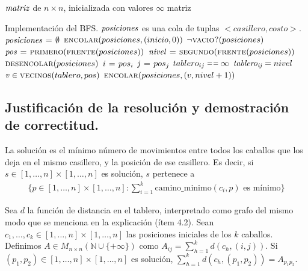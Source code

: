 \vspace*{0.3cm}


\begin{codebox}
\li \Comment $\id{matriz}$ de $n \times n$, inicializada con valores $\infty$
\li \Return matriz
\end{codebox}


\vspace*{0.3cm}


\begin{codebox}
\li \Comment Implementación del BFS. 
\li \Comment $\id{posiciones}$ es una cola de tuplas $<casillero,costo>$.
\li $\id{posiciones} \gets \emptyset$
\li $\textnormal{\scshape encolar}(posiciones, (inicio,0))$
\li \While $\lnot \textnormal{\scshape vacio?}(posiciones)$ \Do
\li   $\id{pos} \gets \proc{primero}(\proc{frente}(posiciones))$
\li   $\id{nivel} \gets \proc{segundo}(\proc{frente}(posiciones))$
\li   $\textnormal{\scshape desencolar}(posiciones)$
\li   $\id{i} \gets pos_i$
\li   $\id{j} \gets pos_j$
\li   \If $tablero_{ij} \isequal \infty$ \Then
\li     $\id{tablero_{ij}} = nivel$
\li     \For $\id{v} \in \proc{vecinos}(tablero,pos)$ \Do
\li       $\textnormal{\scshape encolar}(posiciones,(v,nivel + 1))$
        \End
      \End
    \End
\end{codebox}



\newpage
\subsection{Justificación de la resolución y demostración de correctitud.}

\vspace*{0.3cm}

La solución es el mínimo número de movimientos entre todos los caballos que
los deja en el mismo casillero, y la posición de ese casillero. Es decir, si
$s \in [1, \dots, n] \times [1, \dots, n]$ es solución, $s$ pertenece a
\begin{align*}
\{p \in [1, \dots, n] \times [1, \dots, n] : \sum_{i = 1}^k
\text{camino\_minimo}(c_i, p) \text{ es mínimo}\}
\end{align*}

Sea $d$ la función de distancia en el tablero, interpretado como grafo del
mismo modo que se menciona en la explicación (ítem 4.2).
Sean $c_1, \dots, c_k \in [1, \dots, n] \times [1, \dots, n]$ las posiciones
iniciales de los $k$ caballos. Definimos $A \in M_{n \times n}(\mathbb{N} \cup
\{+\infty\})$ como $A_{ij} = \sum_{h=1}^k d(c_h, (i, j))$. Si $(p_1, p_2) \in
[1, \dots, n] \times [1, \dots, n]$ es solución, $\sum_{h=1}^k d(c_h, (p_1,
p_2)) = A_{p_1 p_2}$.

